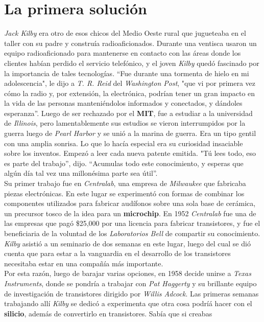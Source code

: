 \section{La primera solución}
\emph{Jack Kilby} era otro de esos chicos del Medio Oeste rural que jugueteaba en el taller con su padre y construía radioaficionados.
Durante una ventisca usaron un equipo radioaficionado para mantenerse en contacto con las áreas donde los clientes habían perdido el servicio
telefónico, y el joven \emph{Kilby} quedó fascinado por la importancia de tales tecnologías. “Fue durante una tormenta de hielo en mi
adolescencia", le dijo a \emph{T. R. Reid} del \emph{Washington Post}, "que vi por primera vez cómo la radio y, por extensión, la electrónica,
podrían tener un gran impacto en la vida de las personas manteniéndolos informados y conectados, y dándoles esperanza”. Luego de ser rechazado 
por el \textbf{MIT}, fue a estudiar a la universidad de \emph{Illinois}, pero lamentablemente sus estudios se vieron interrumpidos por la guerra 
luego de \emph{Pearl Harbor} y se unió a la marina de guerra. Era un tipo gentil con una amplia sonrisa. Lo que lo hacía especial era su
curiosidad insaciable sobre los inventos. Empezó a leer cada nueva patente emitida. "Tú lees todo, eso es parte del trabajo”, dijo. “Acumulas
todo este conocimiento, y esperas que algún día tal vez una millonésima parte sea útil”.\\
Su primer trabajo fue en \emph{Centralab}, una empresa de \emph{Milwaukee} que fabricaba piezas electrónicas. En este lugar se experimentó con
formas de combinar los componentes utilizados para fabricar audífonos sobre una sola base de cerámica, un precursor tosco de la idea para un \textbf
{microchip}. En 1952 \emph{Centralab} fue una de las empresas que pagó \$25,000 por una licencia para fabricar transistores, y fue el beneficiaria
de la voluntad de los \emph{Laboratorios Bell} de compartir su conocimiento. \emph{Kilby} asistió a un seminario de dos semanas en este lugar,
luego del cual se dió cuenta que para estar a la vanguardia en el desarrollo de los transistores necesitaba estar en una compañía más importante.\\
Por esta razón, luego de barajar varias opciones, en 1958 decide unirse a \emph{Texas Instruments}, donde se pondría a trabajar con \emph{Pat
Haggerty} y su brillante equipo de investigación de transistores dirigido por \emph{Willis Adcock}. Las primeras semanas trabajando allí \emph
{Kilby} se dedicó a experimenta que otra cosa podríá hacer con el \textbf{silicio}, además de convertirlo en transistores. Sabía que si creabas
